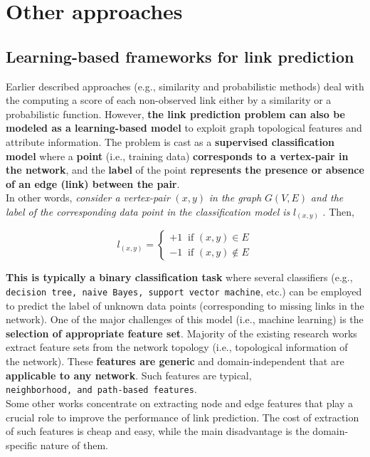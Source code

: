 \section{Other approaches}

\subsection{Learning-based frameworks for link prediction}

Earlier described approaches (e.g., similarity and probabilistic
methods) deal with the computing a score of each non-observed link
either by a similarity or a probabilistic function. However, \textbf{the
    link prediction problem can also be modeled as a learning-based model}
to exploit graph topological features and attribute information. The
problem is cast as a \textbf{supervised classification model} where a
\textbf{point} (i.e., training data) \textbf{corresponds to a
    vertex-pair in the network}, and the \textbf{label} of the point
\textbf{represents the presence or absence of an edge (link) between the
    pair}.\\ In other words, \emph{consider a vertex-pair} \(\mathit{(x, y)}\)
\emph{in the graph} \(\mathit{G(V, E)}\) \emph{and the label of the
    corresponding data point in the classification model is}
\(\mathit{l_{(x,y)}}\) . Then,

\[l_{(x, y)}=
    \begin{cases}
        +1 \ \text{ if } (x, y) \in E \\
        -1 \ \text{ if } (x, y) \notin E
    \end{cases}
\]

\textbf{This is typically a binary classification task} where several
classifiers (e.g.,
\texttt{decision\ tree,\ naive\ Bayes,\ support\ vector\ machine}, etc.)
can be employed to predict the label of unknown data points
(corresponding to missing links in the network). One of the major
challenges of this model (i.e., machine learning) is the
\textbf{selection of appropriate feature set}. Majority of the existing
research works extract feature sets from the network topology (i.e.,
topological information of the network). These \textbf{features are
    generic} and domain-independent that are \textbf{applicable to any
    network}. Such features are typical,
\texttt{neighborhood,\ and\ path-based\ features}.\\ Some other works
concentrate on extracting node and edge features that play a crucial
role to improve the performance of link prediction. The cost of
extraction of such features is cheap and easy, while the main
disadvantage is the domain-specific nature of them.

